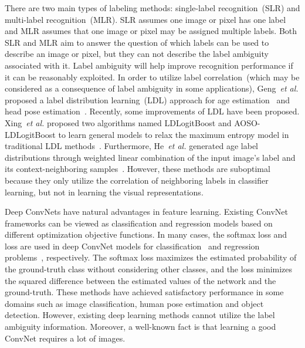 \documentclass[journal]{IEEEtran}
\begin{document}
There are two main types of labeling methods: single-label recognition~(SLR) and multi-label recognition~(MLR). SLR assumes one image or pixel has one label and MLR assumes that one image or pixel may be assigned multiple labels. Both SLR and MLR aim to answer the question of which labels can be used to describe an image or pixel, but they can not describe the label ambiguity associated with it. Label ambiguity will help improve recognition performance if it can be reasonably
exploited. In order to utilize label correlation~(which may be considered as a consequence of label ambiguity in some applications), Geng~\emph{et al.} proposed a label distribution learning~(LDL) approach for age estimation~\cite{geng2013facial} and head pose estimation~\cite{geng2014head}. Recently, some improvements of  LDL have been proposed. Xing~\emph{et al.} proposed two algorithms named LDLogitBoost and AOSO-LDLogitBoost to learn general models to relax the maximum entropy model in traditional LDL methods~\cite{xing2016logistic}. Furthermore, He~\emph{et al.} generated age label distributions through weighted linear combination of the input image's label and its context-neighboring samples~\cite{he35data}. However, these methods are suboptimal because they only utilize the correlation of neighboring labels in classifier learning, but not in learning the visual representations.

Deep ConvNets have natural advantages in feature learning. Existing ConvNet frameworks can be viewed as classification and regression models based on different optimization objective functions. In many cases, the softmax loss and  loss are used in deep ConvNet models for classification~\cite{he2015deep} and regression problems~\cite{belagiannis2015robust}, respectively. The softmax loss maximizes the estimated probability of the ground-truth class without considering other classes, and the  loss minimizes the squared difference between the estimated values of the network and the ground-truth. These methods have achieved satisfactory performance in some domains such as image classification, human pose estimation and object detection. However, existing deep learning methods cannot utilize the label ambiguity information. Moreover, a well-known fact is that learning a good ConvNet requires a lot of images.
\end{document}
